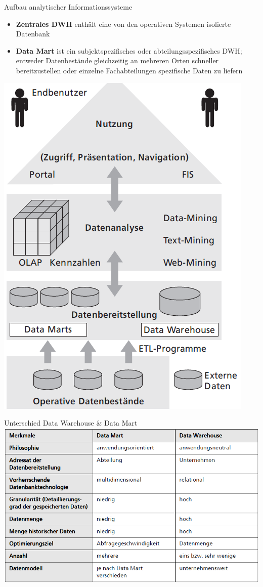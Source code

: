 \documentclass[a6paper,10pt,grid=front%
,toc
]{kartei}
\begin{document}
  \begin{karte}{Aufbau analytischer Informationssysteme}
    \begin{itemize}
      \item \textbf{Zentrales DWH} enthält eine von den operativen Systemen isolierte Datenbank
      \item \textbf{Data Mart} ist ein subjektspezifisches oder abteilungsspezifisches DWH; entweder Datenbestände gleichzeitig an mehreren Orten schneller bereitzustellen oder einzelne Fachabteilungen spezifische Daten zu liefern
    \end{itemize}
    \includegraphics[height=0.5\paperheight]{img/aufbau_analytischer_is}    
  \end{karte}

  \begin{karte}{Unterschied Data Warehouse \& Data Mart}
    \includegraphics[width=0.9\paperheight]{img/diff_dwh_dm}
  \end{karte}
\end{document}
